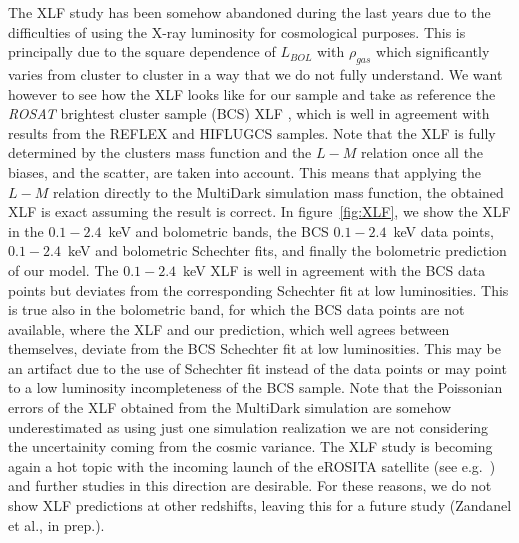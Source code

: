 \documentclass[traditabstract]{aa}
\begin{document}
The XLF study has been somehow abandoned during the last years due to the difficulties of using the X-ray luminosity for cosmological purposes. This is principally due to the square dependence of $L_{BOL}$ with $\rho_{gas}$ which significantly varies from cluster to cluster in a way that we do not fully understand. We want however to see how the XLF looks like for our sample and take as reference the \emph{ROSAT} brightest cluster sample (BCS) XLF \citep{1997ApJ...479L.101E}, which is well in agreement with results from the REFLEX \citep{2002ApJ...566...93B} and HIFLUGCS \citep{2002ApJ...567..716R} samples. Note that the XLF is fully determined by the clusters mass function and the $L-M$ relation once all the biases, and the scatter, are taken into account. This means that applying the \cite{2010MNRAS.406.1773M} $L-M$ relation directly to the MultiDark simulation mass function, the obtained XLF is exact assuming the \cite{2010MNRAS.406.1773M} result is correct.
In figure~\ref{fig:XLF}, we show the \cite{2010MNRAS.406.1773M} XLF in the $0.1-2.4$~keV and bolometric bands, the BCS $0.1-2.4$~keV data points, $0.1-2.4$~keV and bolometric Schechter fits, and finally the bolometric prediction of our model. The $0.1-2.4$~keV \cite{2010MNRAS.406.1773M} XLF is well in agreement with the BCS data points but deviates from the corresponding Schechter fit at low luminosities. This is true also in the bolometric band, for which the BCS data points are not available, where the \cite{2010MNRAS.406.1773M} XLF and our prediction, which well agrees between themselves, deviate from the BCS Schechter fit at low luminosities. This may be an artifact due to the use of Schechter fit instead of the data points or may point to a low luminosity incompleteness of the BCS sample. Note that the Poissonian errors of the XLF obtained from the MultiDark simulation are somehow underestimated as using just one simulation realization we are not considering the uncertainity coming from the cosmic variance. The XLF study is becoming again a hot topic with the incoming launch of the eROSITA satellite (see e.g.~\citealp{2011MSAIS..17..159C}) and further studies in this direction are desirable. For these reasons, we do not show XLF predictions at other redshifts, leaving this for a future study (Zandanel et al., in prep.). 
\end{document}
